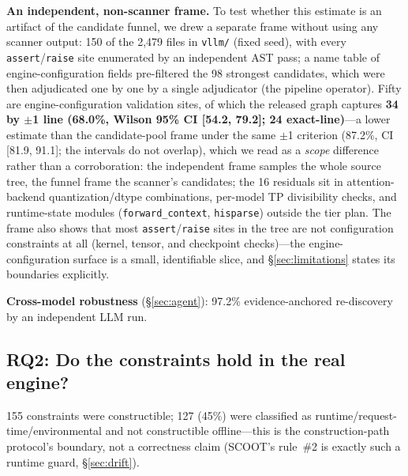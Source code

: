\documentclass[journal]{IEEEtran}
\newcommand{\code}[1]{\texttt{#1}}
\begin{document}
\textbf{An independent, non-scanner frame.} To test whether this estimate is an artifact of the candidate funnel, we drew a separate frame without using any scanner output: 150 of the 2{,}479 files in \code{vllm/} (fixed seed), with every \code{assert}/\code{raise} site enumerated by an independent AST pass; a name table of engine-configuration fields pre-filtered the 98 strongest candidates, which were then adjudicated one by one by a single adjudicator (the pipeline operator). Fifty are engine-configuration validation sites, of which the released graph captures \textbf{34 by $\pm$1 line (68.0\%, Wilson 95\% CI [54.2, 79.2]; 24 exact-line)}---a lower estimate than the candidate-pool frame under the same $\pm$1 criterion (87.2\%, CI [81.9, 91.1]; the intervals do not overlap), which we read as a \emph{scope} difference rather than a corroboration: the independent frame samples the whole source tree, the funnel frame the scanner's candidates; the 16 residuals sit in attention-backend quantization/dtype combinations, per-model TP divisibility checks, and runtime-state modules (\code{forward\_context}, \code{hisparse}) outside the tier plan. The frame also shows that most \code{assert}/\code{raise} sites in the tree are not configuration constraints at all (kernel, tensor, and checkpoint checks)---the engine-configuration surface is a small, identifiable slice, and \S\ref{sec:limitations} states its boundaries explicitly.

\textbf{Cross-model robustness} (\S\ref{sec:agent}): 97.2\% evidence-anchored re-discovery by an independent LLM run.

\subsection{RQ2: Do the constraints hold in the real engine?}
\label{sec:rq2}

155 constraints were constructible; 127 (45\%) were classified as runtime/request-time/environmental and not constructible offline---this is the construction-path protocol's boundary, not a correctness claim (SCOOT's rule~\#2 is exactly such a runtime guard, \S\ref{sec:drift}).
\end{document}
